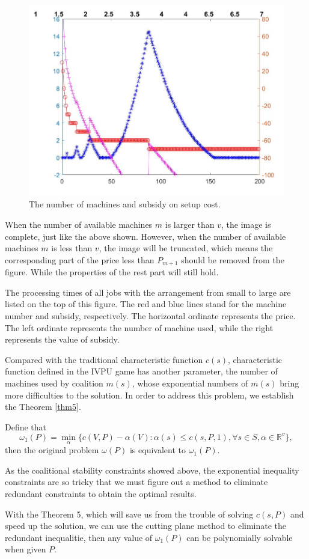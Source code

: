 \begin{figure}[h]%
	\centering  %
	\includegraphics[width=0.8\linewidth]{Figures/Image30}  %
	\caption{The number of machines and subsidy on setup cost.}  %
	\label{fig:Image11}   %
\end{figure}

\begin{remark}
  When the number of available machines $m$ is larger than $v$, the image is complete, just like the above shown. However, when the number of available machines $m$ is less than $v$, the image will be truncated, which means the corresponding part of the price less than $P_{m+1}$ should be removed from the figure. While the properties of the rest part will still hold.
\end{remark}

The processing times of all jobs with the arrangement from small to large are listed on the top of this figure.
The red and blue lines stand for the machine number and subsidy, respectively.
The horizontal ordinate represents the price.
The left ordinate represents the number of machine used, while the right represents the value of subsidy.

Compared with the traditional characteristic function $c(s)$, characteristic function defined in the IVPU game has another parameter, the number of machines used by coalition $m(s)$, whose exponential numbers of $m(s)$ bring more difficulties to the solution.
In order to address this problem, we establish the Theorem \ref{thm5}.

\begin{thm}\label{thm5}
  Define that
  \[
    {\omega_1(P)}=\mathop{\min}_{\alpha}\{c(V,P)-\alpha(V): \alpha(s)\leq c(s,P,1), \forall s \in S, \alpha\in\mathbb{R}^{v}\},
  \]
then the original problem $\omega(P)$ is equivalent to $\omega_1(P)$.
\end{thm}

As the coalitional stability constraints showed above, the exponential inequality constraints are so tricky that we must figure out a method to eliminate redundant constraints to obtain the optimal results.

With the Theorem 5, which will save us from the trouble of solving $c(s, P)$ and speed up the solution, we can use the cutting plane method to eliminate the redundant inequalitie, then  any value of $\omega_1(P)$ can be polynomially solvable when given $P$.
